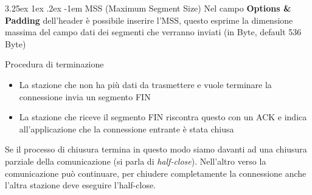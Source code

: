 \documentclass{article}
\makeatletter
\newcounter{subsubsubsection}[subsubsection]
\renewcommand\paragraph{\@startsection{paragraph}{5}{\z@}%
  {3.25ex \@plus1ex \@minus.2ex}%
  {-1em}%
  {\normalfont\normalsize\bfseries}}
\makeatother
\begin{document}
                    \paragraph{MSS (Maximum Segment Size)}
                        Nel campo \textbf{Options \& Padding} dell'header è possibile inserire l'MSS, questo esprime la dimensione massima del campo dati dei segmenti che verranno inviati (in Byte, default 536 Byte)

                    Procedura di terminazione
                    \begin{itemize}
                        \item La stazione che non ha più dati da trasmettere e vuole terminare la connessione invia un segmento FIN
                        \item La stazione che riceve il segmento FIN riscontra questo con un ACK e indica all'applicazione che la connessione entrante è stata chiusa
                    \end{itemize}
                    Se il processo di chiusura termina in questo modo siamo davanti ad una chiusura parziale della comunicazione (si parla di \textit{half-close}). Nell'altro verso la comunicazione può continuare, per chiudere completamente la connessione anche l'altra stazione deve eseguire l'half-close.    
\end{document}
